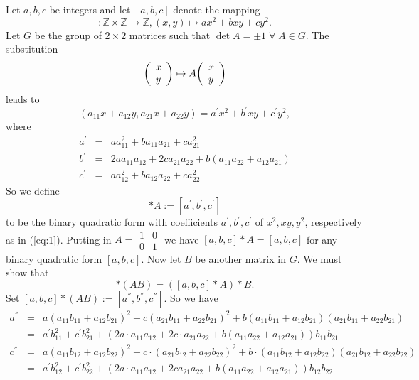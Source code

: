 \documentclass[12pt]{article}
\newcommand{\Z}{{\mathbb Z}}
\newenvironment{vect}{\left(\begin{array}{l}}{\end{array}\right)}
\begin{document}
Let $a,b,c$ be integers and let $[a,b,c]$ denote the mapping
\begin{equation*}
[a,b,c]\colon \Z \times \Z \to \Z, (x,y) \mapsto ax^2 +bxy +cy^2.
\end{equation*}
Let $G$ be the group of $2\times 2$ matrices such that $\det{A}=\pm
1\;\forall\;A\in G$. The substitution
\begin{equation*}
\begin{vect} x \\ y \end{vect} \mapsto A \begin{vect} x \\ y
\end{vect}
\end{equation*}
leads to
\begin{equation*}
[a,b,c](a_{11}x +a_{12}y, a_{21}x+a_{22}y)
=a^{'}x^2+b^{'}xy+c^{'}y^2,
\end{equation*}
where
\begin{eqnarray}
\label{eq:1}
a^{'}&=& aa_{11}^2 +ba_{11}a_{21} +ca_{21}^2 \\
\nonumber b^{'}&=& 2aa_{11}a_{12} +2ca_{21}a_{22}
+b(a_{11}a_{22} +a_{12}a_{21}) \\ \nonumber 
c^{'}&=& aa_{12}^2 +ba_{12} a_{22} +ca_{22}^2
\end{eqnarray}
So we define
\begin{equation*}
[a,b,c]\ast A :=[a^{'}, b^{'}, c^{'}]
\end{equation*}
to be the binary quadratic form with coefficients $a^{'},b^{'}, c^{'}$
of $x^2, xy, y^2$, respectively as in (\ref{eq:1}). Putting in
$A=\begin{matrix}
1&0 \\ 0&1
\end{matrix}$  we have
$[a,b,c]\ast A=[a,b,c]$ for any binary quadratic form $[a,b,c]$.
Now let $B$ be another matrix in $G$. We must show that
\begin{equation*}
[a,b,c] \ast (AB)=([a,b,c] \ast A)\ast B.
\end{equation*}
Set $[a,b,c]\ast (AB):=[a^{''}, b^{''}, c^{''}]$. So we have
\begin{eqnarray}
\label{eq:3}
a^{''}&=&a\left(a_{11}b_{11} +a_{12}b_{21}\right)^2 +c\left(a_{21}b_{11}
+a_{22}b_{21}\right)^2 +b\left(a_{11}b_{11} +a_{12}b_{21}\right)(a_{21}b_{11}
+a_{22}b_{21}) \\
\nonumber &=&a^{'}b_{11}^2 +c^{'}b_{21}^2 +\left(2a\cdot
a_{11}a_{12} +2c\cdot
a_{21}a_{22}+b\left(a_{11}a_{22}+a_{12}a_{21}\right)\right)b_{11}b_{21} \\
c^{''}&=&a\left(a_{11}b_{12}+a_{12}b_{22}\right)^2+c\cdot
\left(a_{21}b_{12}+a_{22}b_{22}\right)^2 +b\cdot
\left(a_{11}b_{12}+a_{12}b_{22}\right)\left(a_{21}b_{12}+a_{22}b_{22}\right) \\
\nonumber &=&a^{'}b_{12}^2+c^{'}b_{22}^2+\left(2a\cdot
a_{11}a_{12}+2ca_{21}a_{22} +b\left(a_{11}a_{22}
+a_{12}a_{21}\right)\right)b_{12}b_{22}
\end{eqnarray}
\end{document}
